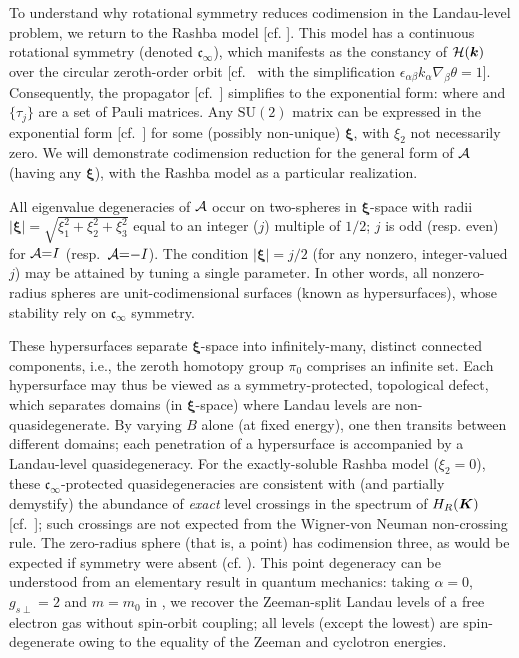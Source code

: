 \documentclass[aps, showpacs, twocolumn, notitlepage, superscriptaddress]{revtex4-1}
\begin{document}
To understand why rotational symmetry reduces codimension in the Landau-level problem, we return to the Rashba model [cf. ]. This model has a continuous rotational symmetry (denoted $\mathfrak{c}_{\infty}$), which manifests as the constancy of ${\cal H}(\boldsymbol{k})$ over the circular zeroth-order orbit [cf.\  with the simplification $\epsilon_{\alpha\beta} k_{\alpha}\nabla_{\beta}\theta=1$]. Consequently, the propagator [cf.\ ] simplifies to the exponential form:
where
and $\{\tau_j\}$ are a set of Pauli matrices. Any $\text{SU}(2)$ matrix can be expressed in the exponential form [cf.\ ] for some (possibly non-unique) $\boldsymbol{\xi}$, with $\xi_2$ not necessarily zero. We will demonstrate codimension reduction for the general form of ${\cal A}$ (having any $\boldsymbol{\xi}$), with the Rashba model as a particular realization.

All eigenvalue degeneracies of ${\cal A}$ occur on two-spheres in $\boldsymbol{\xi}$-space with radii $|\boldsymbol{\xi}|{=}\sqrt{\xi_1^2{+}\xi_2^2{+}\xi_3^2}$ equal to an integer ($j$)  multiple of $1/2$;  ${j}$ is odd (resp. even) for  ${\cal A}{=}I$ (resp.\ ${\cal A}{=}{-}I$).  The condition $|\boldsymbol{\xi}|{=}j/2$ (for any nonzero, integer-valued $j$) may be attained by tuning a single parameter. In other words, all nonzero-radius spheres are unit-codimensional surfaces (known as hypersurfaces), whose stability rely on $\mathfrak{c}_{\infty}$ symmetry. 

These hypersurfaces separate $\boldsymbol{\xi}$-space into infinitely-many, distinct connected components, i.e., the zeroth homotopy group $\pi_0$ comprises an infinite set. Each hypersurface may thus be viewed as a symmetry-protected, topological defect, which separates domains (in $\boldsymbol{\xi}$-space) where Landau levels are non-quasidegenerate. By varying $B$ alone (at fixed energy), one then transits between different domains; each penetration of a hypersurface is accompanied by a Landau-level quasidegeneracy. For the exactly-soluble Rashba model ($\xi_2{=}0$), these $\mathfrak{c}_{\infty}$-protected quasidegeneracies  are consistent with (and partially demystify)  the abundance of \textit{exact} level crossings in the spectrum of $H_R(\boldsymbol{K})$ [cf.\ ]; such crossings are not expected from the Wigner-von Neuman non-crossing rule\cite{neumann2000behaviour}. The zero-radius sphere (that is, a point) has codimension three, as would be expected if symmetry were absent (cf. ). This point degeneracy can be understood from an elementary result in quantum mechanics: taking $\alpha{=}0$, $g_{s\perp}{=}2$ {and} $m{=}m_0$ in , we recover the Zeeman-split Landau levels of a free electron gas without spin-orbit coupling; all levels (except the lowest) are spin-degenerate owing to the equality of the Zeeman and cyclotron energies\cite{landau2013course}.
\end{document}
